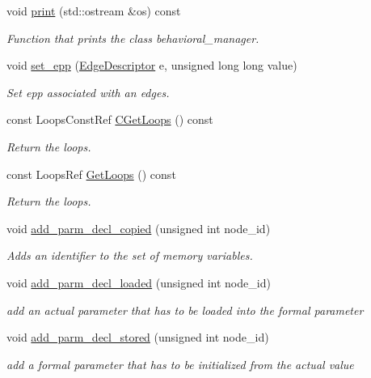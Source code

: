 \begin{DoxyCompactItemize}
void \hyperlink{classFunctionBehavior_a67538dca89bd16d5a2aadb085fae1186}{print} (std\+::ostream \&os) const
\begin{DoxyCompactList}\small\item\em Function that prints the class behavioral\+\_\+manager. \end{DoxyCompactList}\item 
void \hyperlink{classFunctionBehavior_a0652ba7d08f71e9e00897e9f35ae3e5c}{set\+\_\+epp} (\hyperlink{graph_8hpp_a9eb9afea34e09f484b21f2efd263dd48}{Edge\+Descriptor} e, unsigned long long value)
\begin{DoxyCompactList}\small\item\em Set epp associated with an edges. \end{DoxyCompactList}\item 
const Loops\+Const\+Ref \hyperlink{classFunctionBehavior_ae532eee749635388e7e4b0a460ec5778}{C\+Get\+Loops} () const
\begin{DoxyCompactList}\small\item\em Return the loops. \end{DoxyCompactList}\item 
const Loops\+Ref \hyperlink{classFunctionBehavior_a88594c29cc7a563b440b08978e91bafc}{Get\+Loops} () const
\begin{DoxyCompactList}\small\item\em Return the loops. \end{DoxyCompactList}\item 
void \hyperlink{classFunctionBehavior_a96cee8a4ca46fe58894c405c4fe2cf83}{add\+\_\+parm\+\_\+decl\+\_\+copied} (unsigned int node\+\_\+id)
\begin{DoxyCompactList}\small\item\em Adds an identifier to the set of memory variables. \end{DoxyCompactList}\item 
void \hyperlink{classFunctionBehavior_a437de4136f7ccf99af99a9e87d2187e1}{add\+\_\+parm\+\_\+decl\+\_\+loaded} (unsigned int node\+\_\+id)
\begin{DoxyCompactList}\small\item\em add an actual parameter that has to be loaded into the formal parameter \end{DoxyCompactList}\item 
void \hyperlink{classFunctionBehavior_acaf8196ed294be7d3e70f3ccad5044a5}{add\+\_\+parm\+\_\+decl\+\_\+stored} (unsigned int node\+\_\+id)
\begin{DoxyCompactList}\small\item\em add a formal parameter that has to be initialized from the actual value \end{DoxyCompactList}\item 

\end{DoxyCompactItemize}
